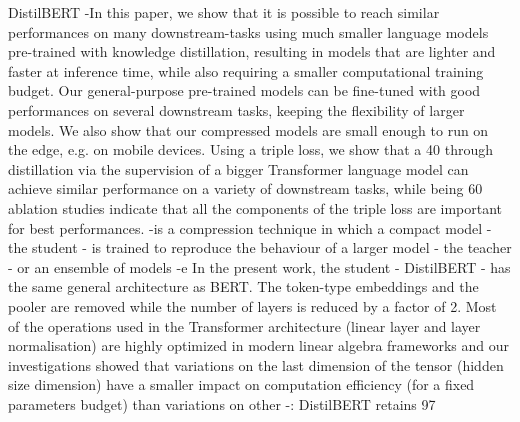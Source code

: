 DistilBERT
-In this paper, we show that it is possible to reach similar performances on many downstream-tasks
using much smaller language models pre-trained with knowledge distillation, resulting in models
that are lighter and faster at inference time, while also requiring a smaller computational training
budget. Our general-purpose pre-trained models can be fine-tuned with good performances on several
downstream tasks, keeping the flexibility of larger models. We also show that our compressed models
are small enough to run on the edge, e.g. on mobile devices.
Using a triple loss, we show that a 40%
through distillation via the supervision of a bigger Transformer language model can achieve similar
performance on a variety of downstream tasks, while being 60%
ablation studies indicate that all the components of the triple loss are important for best performances.
-is a compression technique in which
a compact model - the student - is trained to reproduce the behaviour of a larger model - the teacher -
or an ensemble of models
-e In the present work, the student - DistilBERT - has the same general architecture as BERT. The token-type embeddings and the pooler are removed while the number of layers
is reduced by a factor of 2. Most of the operations used in the Transformer architecture (linear
layer and layer normalisation) are highly optimized in modern linear algebra frameworks and our
investigations showed that variations on the last dimension of the tensor (hidden size dimension) have
a smaller impact on computation efficiency (for a fixed parameters budget) than variations on other
-: DistilBERT retains 97%


